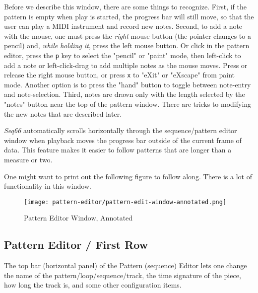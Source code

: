    Before we describe this window, there are some things to recognize.
   First, if the pattern is empty when play is started, the progress bar will
   still move, so that the user can play a MIDI instrument and record new notes.
   Second, to add a note with the mouse, one must press the \textsl{right}
   mouse button (the pointer changes to a pencil) and,
   \textsl{while holding it}, press the left mouse button.
   Or click in the pattern editor, press the
   \texttt{p} key to select the "pencil" or "paint" mode, then
   left-click to add a note or
   left-click-drag to add multiple notes as the mouse moves.
   Press or release the right mouse button, or press
   \texttt{x} to "eXit" or "eXscape" from paint mode.
   Another option is to press the "hand" button to toggle between note-entry
   and note-selection.
   Third, notes are drawn only with the length selected by the "notes" button
   near the top of the pattern window.  There are tricks to
   modifying the new notes that are described later.

   \textsl{Seq66} automatically scrolls
   horizontally through the sequence/pattern editor window when
   playback moves the progress bar outside of the current frame of data.  This
   feature makes it easier to follow patterns that are longer than a measure or
   two.

   One might want to print out the following figure to follow along.  There is
   a lot of functionality in this window.

\begin{figure}[H]
   \centering 
   \texttt{[image: pattern-editor/pattern-edit-window-annotated.png]}
   \caption{Pattern Editor Window, Annotated}
   \label{fig:pattern_editor_window_annotated}
\end{figure}

\subsection{Pattern Editor / First Row}
\label{subsec:pattern_editor_first_row}

   The top bar (horizontal panel) of the Pattern (sequence) Editor
   lets one change the name of
   the pattern/loop/sequence/track, the time signature of the piece, how long
   the track is, and some other configuration items.

